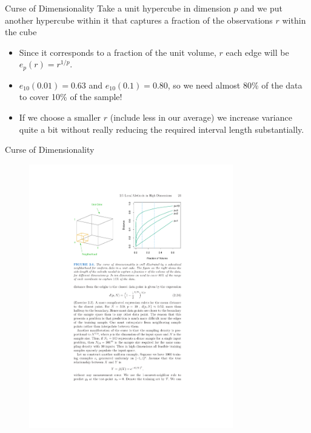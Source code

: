 \documentclass[11pt,handout,xcolor=pdftex,dvipsnames,table,mathserif]{beamer}
\begin{document}
\begin{frame}{Curse of Dimensionality}
Take a unit hypercube in dimension $p$ and we put another hypercube within it that captures a fraction of the observations $r$ within the cube
\begin{itemize}
\item Since it corresponds to a fraction of the unit volume, $r$ each edge  will be $e_p(r) = r^{1/p}$.
\item $e_{10}(0.01) = 0.63$ and $e_{10}(0.1) = 0.80$, so we need almost 80\% of the data to cover 10\% of the sample!
\item If we choose a smaller $r$ (include less in our average) we increase variance quite a bit without really reducing the required interval length substantially.
\end{itemize}
\end{frame}

\begin{frame}{Curse of Dimensionality}
\begin{figure}[htbp]
\begin{center}
\includegraphics[width=3.5in]{./resources/figure26.pdf}
\label{class15nn}
\end{center}
\end{figure}
\end{frame}
\end{document}
